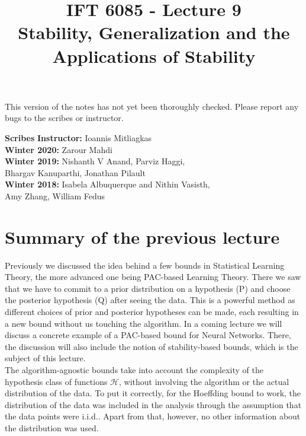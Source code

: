 \documentclass{article}
\title{IFT 6085 - Lecture 9 \\ Stability, Generalization and the Applications of Stability}
\date{}
\begin{document}
 

\maketitle

\vspace{-0.5in}
\begin{center}
This version of the notes has not yet been thoroughly checked.
Please report any bugs to the scribes or instructor.
\end{center}
\vspace{0.2in}

\textbf{Scribes}\hfill
\textbf{Instructor:}  Ioannis Mitliagkas\\
\textbf{Winter 2020:} Zarour Mahdi\\
\textbf{Winter 2019:} Nishanth V Anand, Parviz Haggi,\\
Bhargav Kanuparthi, Jonathan Pilault\\
\textbf{Winter 2018:} Isabela Albuquerque and Nithin Vasisth,\\ Amy Zhang, William Fedus



\newcommand{\infgc}{\inf_{g \in \mathcal{C}}}
\newcommand{\supgc}{\sup_{g \in \mathcal{C}}}

\newcommand{\Prob}{\mathbb{P}}
\newcommand{\E}{\mathbb{E}}
\newcommand{\reals}{\mathbb{R}}

\section{Summary of the previous lecture}
Previously we discussed the idea behind a few bounds in Statistical Learning Theory, the more advanced one being PAC-based Learning Theory. There we saw that we have to commit to a prior distribution on a hypothesis (P) and choose the posterior hypothesis (Q) after seeing the data. This is a powerful method as different choices of prior and posterior hypotheses can be made, each resulting in a new bound without us touching the algorithm. 
In a coming lecture we will discuss a concrete example of a PAC-based bound for Neural Networks. There, the discussion will also include the notion of stability-based bounds, which is the subject of this lecture.\\


The algorithm-agnostic bounds take into account the complexity of the hypothesis class of functions $\mathcal{H}$, without involving the algorithm or the actual distribution of the data. To put it correctly, for the Hoeffding bound to work, the distribution of the data was included in the analysis through the assumption that the data points were i.i.d.. Apart from that, however, no other information about the distribution was used. \\
\end{document}
